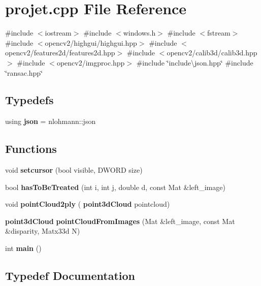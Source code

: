 \section{projet.\+cpp File Reference}
\label{projet_8cpp}
{\ttfamily \#include $<$iostream$>$}\newline
{\ttfamily \#include $<$windows.\+h$>$}\newline
{\ttfamily \#include $<$fstream$>$}\newline
{\ttfamily \#include $<$opencv2/highgui/highgui.\+hpp$>$}\newline
{\ttfamily \#include $<$opencv2/features2d/features2d.\+hpp$>$}\newline
{\ttfamily \#include $<$opencv2/calib3d/calib3d.\+hpp$>$}\newline
{\ttfamily \#include $<$opencv2/imgproc.\+hpp$>$}\newline
{\ttfamily \#include \char`\"{}include\textbackslash{}json.\+hpp\char`\"{}}\newline
{\ttfamily \#include \char`\"{}ransac.\+hpp\char`\"{}}\newline
\subsection*{Typedefs}
\begin{DoxyCompactItemize}
\item 
using \textbf{ json} = nlohmann\+::json
\end{DoxyCompactItemize}
\subsection*{Functions}
\begin{DoxyCompactItemize}
\item 
void \textbf{ setcursor} (bool visible, D\+W\+O\+RD size)
\item 
bool \textbf{ has\+To\+Be\+Treated} (int i, int j, double d, const Mat \&left\+\_\+image)
\item 
void \textbf{ point\+Cloud2ply} (\textbf{ point3d\+Cloud} pointcloud)
\item 
\textbf{ point3d\+Cloud} \textbf{ point\+Cloud\+From\+Images} (Mat \&left\+\_\+image, const Mat \&disparity, Matx33d N)
\item 
int \textbf{ main} ()
\end{DoxyCompactItemize}


\subsection{Typedef Documentation}
\mbox{\label{projet_8cpp_ab701e3ac61a85b337ec5c1abaad6742d}} 
